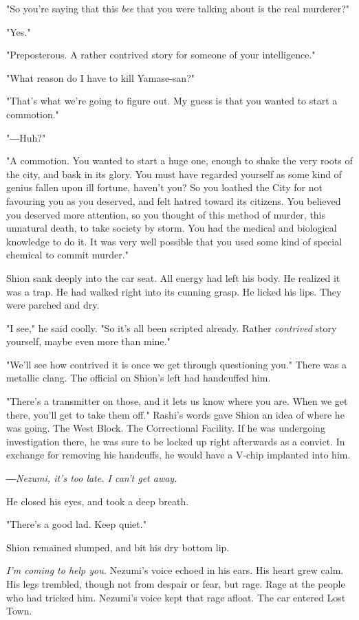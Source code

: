 "So you're saying that this \emph{bee} that you were talking about is the real
murderer?"

"Yes."

"Preposterous. A rather contrived story for someone of your
intelligence."

"What reason do I have to kill Yamase-san?"

"That's what we're going to figure out. My guess is that you wanted to
start a commotion."

"―Huh?"

"A commotion. You wanted to start a huge one, enough to shake the very
roots of the city, and bask in its glory. You must have regarded
yourself as some kind of genius fallen upon ill fortune, haven't you? So
you loathed the City for not favouring you as you deserved, and felt
hatred toward its citizens. You believed you deserved more attention, so
you thought of this method of murder, this unnatural death, to take
society by storm. You had the medical and biological knowledge to do it.
It was very well possible that you used some kind of special chemical to
commit murder."

Shion sank deeply into the car seat. All energy had left his body. He
realized it was a trap. He had walked right into its cunning grasp. He
licked his lips. They were parched and dry.

"I see," he said coolly. "So it's all been scripted already. Rather
\emph{contrived} story yourself, maybe even more than mine."

"We'll see how contrived it is once we get through questioning you."
There was a metallic clang. The official on Shion's left had handcuffed
him.

"There's a transmitter on those, and it lets us know where you are. When
we get there, you'll get to take them off." Rashi's words gave Shion an
idea of where he was going. The West Block. The Correctional Facility.
If he was undergoing investigation there, he was sure to be locked up
right afterwards as a convict. In exchange for removing his handcuffs,
he would have a V-chip implanted into him.

\emph{―Nezumi, it's too late. I can't get away.}

He closed his eyes, and took a deep breath.

"There's a good lad. Keep quiet."

Shion remained slumped, and bit his dry bottom lip.

\emph{I'm coming to help you.} Nezumi's voice echoed in his ears. His heart
grew calm. His legs trembled, though not from despair or fear, but rage.
Rage at the people who had tricked him. Nezumi's voice kept that rage
afloat. The car entered Lost Town.

